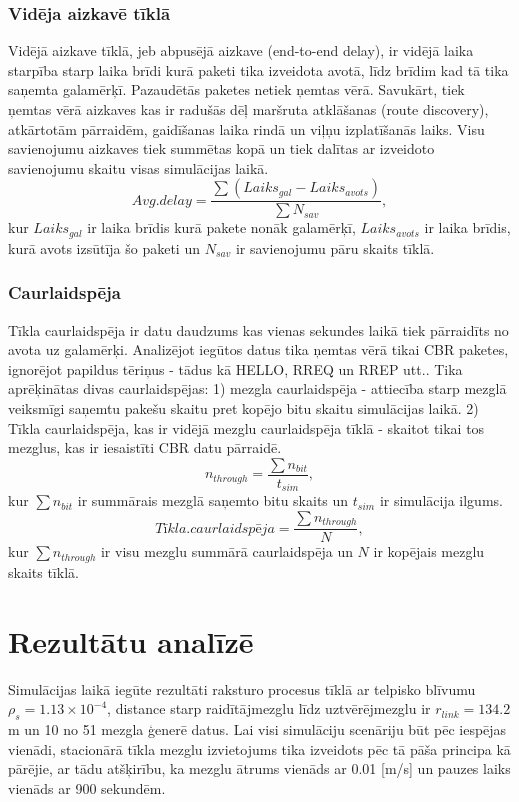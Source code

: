 \subsubsection{Vidēja aizkavē tīklā}
Vidējā aizkave tīklā, jeb abpusējā aizkave (end-to-end delay), ir vidējā laika starpība starp laika brīdi kurā paketi tika izveidota avotā, līdz brīdim kad tā tika saņemta galamērķī. Pazaudētās paketes netiek ņemtas vērā. Savukārt, tiek ņemtas vērā aizkaves kas ir radušās dēļ maršruta atklāšanas (route discovery), atkārtotām pārraidēm,  gaidīšanas laika rindā un viļņu izplatīšanās laiks. Visu savienojumu aizkaves tiek summētas kopā un tiek dalītas ar izveidoto savienojumu skaitu visas simulācijas laikā.
\begin{equation}
Avg.delay=\frac{\sum( Laiks_{gal} - Laiks_{avots})}{\sum N_{sav}},
\end{equation}
kur $Laiks_{gal}$ ir laika brīdis kurā pakete nonāk galamērķī, $Laiks_{avots}$ ir laika brīdis, kurā avots izsūtīja šo paketi un $N_{sav}$ ir savienojumu pāru skaits tīklā.

\subsubsection{Caurlaidspēja}
Tīkla caurlaidspēja ir datu daudzums kas vienas sekundes laikā tiek pārraidīts no avota uz galamērķi. Analizējot iegūtos datus tika ņemtas vērā tikai CBR paketes, ignorējot papildus tēriņus - tādus kā HELLO, RREQ un RREP utt.. Tika aprēķinātas divas caurlaidspējas: 1) mezgla caurlaidspēja - attiecība starp mezglā veiksmīgi saņemtu pakešu skaitu pret kopējo bitu skaitu simulācijas laikā. 2) Tīkla caurlaidspēja, kas ir vidējā mezglu caurlaidspēja tīklā - skaitot tikai tos mezglus, kas ir iesaistīti CBR datu pārraidē.
\begin{equation}
 n_{through}=\frac{\sum n_{bit}}{t_{sim}},
\end{equation}
kur $\sum n_{bit}$ ir summārais mezglā saņemto bitu skaits un $t_{sim}$ ir simulācija ilgums.
\begin{equation}
Tīkla.caurlaidspēja =\frac{\sum n_{through}}{N},
\end{equation}
kur $ \sum n_{through}$ ir visu mezglu summārā caurlaidspēja un $N$ ir  kopējais mezglu skaits tīklā.


\section{Rezultātu analīzē}
Simulācijas laikā iegūte rezultāti raksturo procesus tīklā ar telpisko blīvumu $\rho_{s} = 1.13\times10^{-4}$, distance starp raidītājmezglu līdz uztvērējmezglu ir $r_{link} = 134.2$ m un 10 no 51 mezgla ģenerē datus. Lai visi simulāciju scenāriju būt pēc iespējas vienādi, stacionārā tīkla mezglu izvietojums tika izveidots pēc tā pāša principa kā pārējie, ar tādu atšķirību, ka mezglu ātrums vienāds ar 0.01 [m/s] un pauzes laiks vienāds ar 900 sekundēm.


